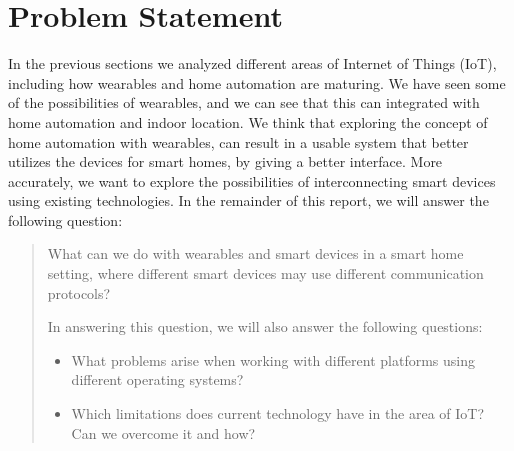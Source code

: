 \section{Problem Statement}\label{sec:researchstatement}
In the previous sections we analyzed different areas of Internet of Things (IoT), 
including how wearables and home automation are maturing. 
We have seen some of the possibilities of wearables, 
and we can see that this can integrated with home automation and indoor location.
We think that exploring the concept of home automation with wearables, 
can result in a usable system that better utilizes the devices for smart homes, 
by giving a better interface. 
More accurately, we want to explore the possibilities of interconnecting smart devices using existing technologies.
In the remainder of this report, we will answer the following question:
\begin{framed}
    \begin{quote}
        What can we do with wearables and smart devices in a smart home setting, where different smart devices may use different communication protocols?
        
        In answering this question, we will also answer the following questions:
        \begin{itemize}
            \item What problems arise when working with different platforms using different operating systems?
            \item Which limitations does current technology have in the area of IoT? Can we overcome it and how? 
           \end{itemize} 
    \end{quote}
\end{framed}


%

